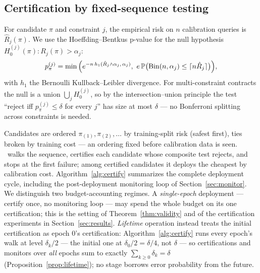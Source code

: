 \subsection{Certification by fixed-sequence testing}
\label{sec:certification}

For candidate $\pi$ and constraint $j$, the empirical risk on $n$
calibration queries is $\hat R_j(\pi)$. We use the Hoeffding--Bentkus
p-value \citep{hoeffding1963probability,bentkus2004hoeffding,
angelopoulos2021ltt} for the null
hypothesis $H_0^{(j)}(\pi) : R_j(\pi) > \alpha_j$:
\[
p^{(j)}_{\pi} = \min\Big( e^{-n\,h_1(\hat R_j \wedge \alpha_j,\,
\alpha_j)},\
e\,\mathbb{P}\big(\mathrm{Bin}(n, \alpha_j) \le \lceil n \hat R_j \rceil
\big) \Big),
\]
with $h_1$ the Bernoulli Kullback--Leibler divergence. For
multi-constraint contracts the null is a union $\bigcup_j H_0^{(j)}$,
so by the intersection--union principle \citep{berger1982iut} the test
``reject iff $p^{(j)}_\pi \le \delta$ for every $j$'' has size at most
$\delta$ --- no Bonferroni splitting across constraints is needed.

Candidates are ordered $\pi_{(1)}, \pi_{(2)}, \dots$ by training-split
risk (safest first), ties broken by training cost --- an ordering fixed
before calibration data is seen. \system\ walks the sequence, certifies
each candidate whose composite test rejects, and stops at the first
failure; among certified candidates it deploys the cheapest by
calibration cost. Algorithm~\ref{alg:certify} summarizes the complete
deployment cycle, including the post-deployment monitoring loop of
Section~\ref{sec:monitor}. We distinguish two budget-accounting
regimes. A \emph{single-epoch} deployment --- certify once, no
monitoring loop --- may spend the whole budget on its one
certification; this is the setting of Theorem~\ref{thm:validity} and
of the certification experiments in Section~\ref{sec:results}.
\emph{Lifetime} operation instead treats the initial certification as
epoch 0's certification: Algorithm~\ref{alg:certify} runs every
epoch's walk at level $\delta_k/2$ --- the initial one at
$\delta_0/2 = \delta/4$, not $\delta$ --- so certifications and
monitors over \emph{all} epochs sum to exactly
$\sum_{k \ge 0} \delta_k = \delta$
(Proposition~\ref{prop:lifetime}); no stage borrows error probability
from the future.

